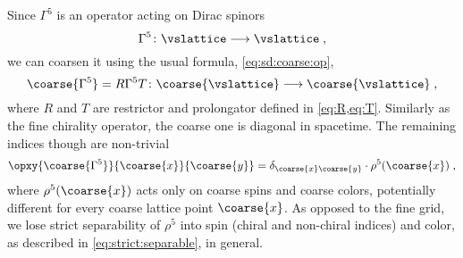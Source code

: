 Since $\Gamma^5$ is an operator acting on Dirac spinors
\begin{equation}
\Gamma^5 \colon \vslattice \longrightarrow \vslattice \;,
\end{equation}
we can coarsen it using the usual formula, \cref{eq:sd:coarse:op},
\begin{equation}
\coarse{\Gamma^5} = R \Gamma^5 T \colon \coarse{\vslattice} \longrightarrow \coarse{\vslattice} \;,
\end{equation}
where $R$ and $T$ are restrictor and prolongator defined in \cref{eq:R,eq:T}.
Similarly as the fine chirality operator, the coarse one is diagonal in spacetime.
The remaining indices though are non-trivial
\begin{equation}
\opxy{\coarse{\Gamma^5}}{\coarse{x}}{\coarse{y}} = \delta_{\coarse{x} \coarse{y}} \cdot \rho^5(\coarse{x}) \;,
\end{equation}
where $\rho^{5}(\coarse{x})$ acts only on coarse spins and coarse colors, potentially different for every coarse lattice point $\coarse{x}$.
As opposed to the fine grid, we lose strict separability of $\rho^5$ into spin (chiral and non-chiral indices) and color, as described in \cref{eq:strict:separable}, in general.

